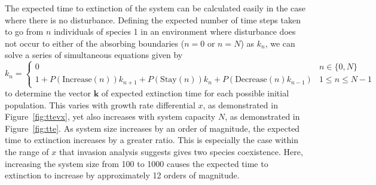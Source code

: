  The expected time to extinction of the system can be calculated easily in the case where there is no disturbance. Defining the expected number of time steps taken to go from $n$ individuals of species 1 in an environment where disturbance does not occur to either of the absorbing boundaries ($n=0$ or $n=N$) as $k_n$, we can solve a series of simultaneous equations given by
\begin{equation}
k_n=\begin{cases}
0 & n\in\{0,N\} \\
1+P(\text{Increase}(n))k_{n+1}+P(\text{Stay}(n))k_n+P(\text{Decrease}(n)k_{n-1}) & 1\leq n\leq N-1
\end{cases} \end{equation}
to determine the vector $\mathbf{k}$ of expected extinction time for each possible initial population. This varies with growth rate differential $x$, as demonstrated in Figure~\ref{fig:ttevx}, yet also increases with system capacity $N$, as demonstrated in Figure~\ref{fig:tte}. As system size increases by an order of magnitude, the expected time to extinction increases by a greater ratio. This is especially the case within the range of $x$ that invasion analysis suggests gives two species coexistence. Here, increasing the system size from 100 to 1000 causes the expected time to extinction to increase by approximately 12 orders of magnitude.

